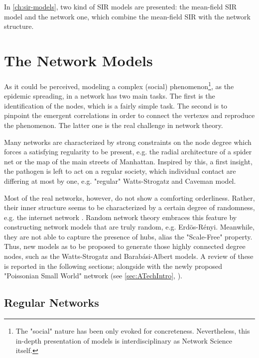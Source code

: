 \documentclass[a4paper,10pt,twoside]{book} %
\theoremstyle{definition}
\begin{document}
In \autoref{ch:sir-models}, two kind of SIR models are presented: the mean-field SIR model and the network one, which combine the mean-field SIR with the network structure.

\chapter{The Network Models}
\label{ch:network-models}
As it could be perceived, modeling a complex (social) phenomenon\footnote{The "social" nature has been only evoked for concreteness. Nevertheless, this in-depth presentation of models is interdisciplinary as Network Science itself.}, as the epidemic spreading, in a network has two main tasks. The first is the identification of the nodes, which is a fairly simple task. The second is to pinpoint the emergent correlations in order to connect the vertexes and reproduce the phenomenon. The latter one is the real challenge in network theory.

Many networks are characterized by strong constraints on the node degree which forces a satisfying regularity to be present, e.g. the radial architecture of a spider net or the map of the main streets of Manhattan.
Inspired by this, a first insight, the pathogen is left to act on a regular society, which individual contact are differing at most by one, e.g. "regular" Watts-Strogatz and Caveman model.

Most of the real networks, however, do not show a comforting orderliness. 
Rather, their inner structure seems to be characterized by a certain degree of randomness, e.g. the internet network \cite{barabasi::2016networkbook}. Random network theory embraces this feature by constructing network models that are truly random, e.g. Erdös-Rényi. Meanwhile, they are not able to capture the presence of hubs, alias the "Scale-Free" property. Thus, new models as to be proposed to generate those highly connected degree nodes, such as the Watts-Strogatz and Barabási-Albert models.
A review of these is reported in the following sections; alongside with the newly proposed "Poissonian Small World" network (see \autoref{sec:ATechIntro}, \cite{Thurner::NetBasedExpl}).

\section{Regular Networks}
\label{sec:RLN-Caveman_Description}
\end{document}
